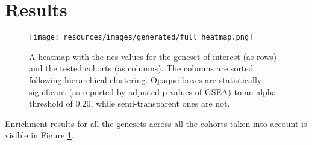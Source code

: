 \section{Results}

\begin{figure}
    \centering
    \texttt{[image: resources/images/generated/full\_heatmap.png]}
    \caption{A heatmap with the \gls{nes} values for the geneset of interest (as rows) and the tested cohorts (as columns). The columns are sorted following hierarchical clustering. Opaque boxes are statistically significant (as reported by adjusted p-values of GSEA) to an alpha threshold of $0.20$, while semi-transparent ones are not.}
    \label{fig:full_enrichment_heatmap}
\end{figure}

Enrichment results for all the genesets across all the cohorts taken into account is visible in Figure \ref{fig:full_enrichment_heatmap}.